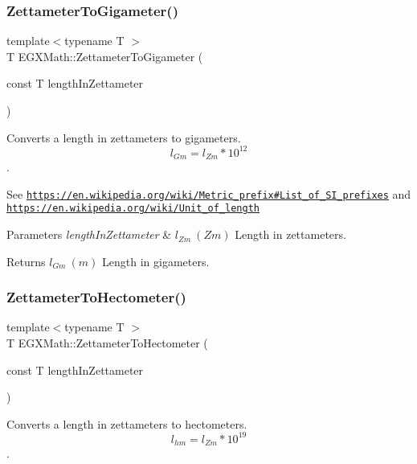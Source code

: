 \subsubsection{\texorpdfstring{Zettameter\+To\+Gigameter()}{ZettameterToGigameter()}}
{\footnotesize\ttfamily template$<$typename T $>$ \\
T E\+G\+X\+Math\+::\+Zettameter\+To\+Gigameter (\begin{DoxyParamCaption}\item[{const T}]{length\+In\+Zettameter }\end{DoxyParamCaption})}



Converts a length in zettameters to gigameters. \[ l_{Gm}=l_{Zm} * 10^{12} \]. 

See \href{https://en.wikipedia.org/wiki/Metric_prefix#List_of_SI_prefixes}{\tt https\+://en.\+wikipedia.\+org/wiki/\+Metric\+\_\+prefix\#\+List\+\_\+of\+\_\+\+S\+I\+\_\+prefixes} and \href{https://en.wikipedia.org/wiki/Unit_of_length}{\tt https\+://en.\+wikipedia.\+org/wiki/\+Unit\+\_\+of\+\_\+length} 
\begin{DoxyParams}{Parameters}
{\em length\+In\+Zettameter} & $ l_{Zm}\ (Zm)$ Length in zettameters. \\
\hline
\end{DoxyParams}
\begin{DoxyReturn}{Returns}
$ l_{Gm}\ (m)$ Length in gigameters. 
\end{DoxyReturn}
\mbox{\label{group___e_g_x_math-_conversions-_length_conversions-_zettameter-_s_i_gada762e454268ba506fcbf3caae74f14e}} 
\subsubsection{\texorpdfstring{Zettameter\+To\+Hectometer()}{ZettameterToHectometer()}}
{\footnotesize\ttfamily template$<$typename T $>$ \\
T E\+G\+X\+Math\+::\+Zettameter\+To\+Hectometer (\begin{DoxyParamCaption}\item[{const T}]{length\+In\+Zettameter }\end{DoxyParamCaption})}



Converts a length in zettameters to hectometers. \[ l_{hm}=l_{Zm} * 10^{19} \]. 

